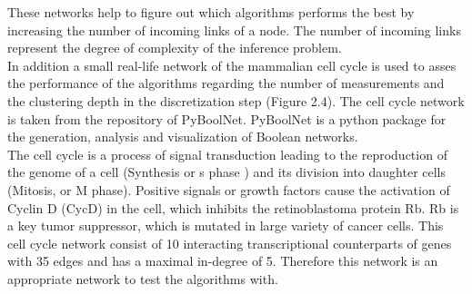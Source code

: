 These networks help to figure out which algorithms performs the best by increasing the number of incoming links of a node. The number of incoming links represent the degree of complexity of the inference problem.\\
In addition a small real-life network of the mammalian cell cycle is used to asses the performance of the algorithms regarding the number of measurements and the clustering depth in the discretization step (Figure 2.4). The cell cycle network is taken from the repository of PyBoolNet. PyBoolNet is a python package for the generation, analysis and visualization of Boolean networks.\\
The cell cycle is a process of signal transduction leading to the reproduction of the genome of a cell (Synthesis or s phase ) and its division into daughter cells (Mitosis, or M phase). Positive signals or growth factors cause the activation of Cyclin D (CycD) in the cell, which inhibits the retinoblastoma protein Rb. Rb is a key tumor suppressor, which is mutated in large variety of cancer cells.
This cell cycle network consist of 10 interacting transcriptional counterparts of genes with 35 edges and has a maximal in-degree of 5. Therefore this network is an appropriate network to test the algorithms with.
\captionsetup{width=0.8\linewidth}
